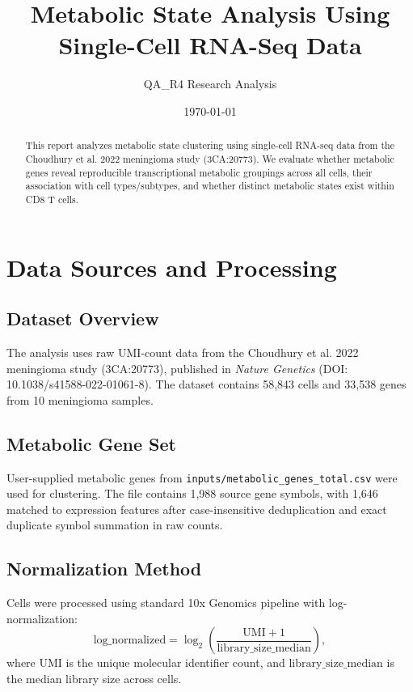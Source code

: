 \documentclass[11pt]{article}
\title{\textbf{Metabolic State Analysis Using Single-Cell RNA-Seq Data}}
\author{QA_R4 Research Analysis}
\date{\today}
\begin{document}
\maketitle

\begin{abstract}
This report analyzes metabolic state clustering using single-cell RNA-seq data from the Choudhury et al. 2022 meningioma study (3CA:20773). We evaluate whether metabolic genes reveal reproducible transcriptional metabolic groupings across all cells, their association with cell types/subtypes, and whether distinct metabolic states exist within CD8 T cells.
\end{abstract}

\section{Data Sources and Processing}

\subsection{Dataset Overview}
The analysis uses raw UMI-count data from the Choudhury et al. 2022 meningioma study (3CA:20773), published in \textit{Nature Genetics} (DOI: 10.1038/s41588-022-01061-8). The dataset contains 58,843 cells and 33,538 genes from 10 meningioma samples.

\subsection{Metabolic Gene Set}
User-supplied metabolic genes from \texttt{inputs/metabolic\_genes\_total.csv} were used for clustering. The file contains 1,988 source gene symbols, with 1,646 matched to expression features after case-insensitive deduplication and exact duplicate symbol summation in raw counts.

\subsection{Normalization Method}
Cells were processed using standard 10x Genomics pipeline with log-normalization:
\begin{equation}
    \text{log\_normalized} = \log_2\left(\frac{\text{UMI} + 1}{\text{library\_size\_median}}\right),
\end{equation}
where $\text{UMI}$ is the unique molecular identifier count, and $\text{library\_size\_median}$ is the median library size across cells.
\end{document}
